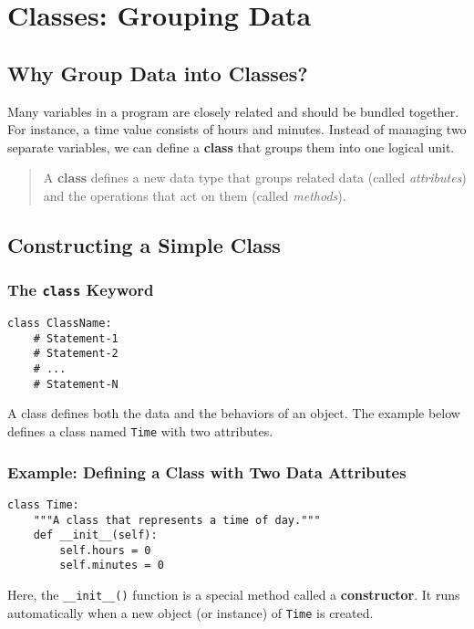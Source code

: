 \chapter{Classes: Grouping Data}

\section{Why Group Data into Classes?}

Many variables in a program are closely related and should be bundled together.
For instance, a time value consists of hours and minutes.
Instead of managing two separate variables, we can define a \textbf{class} that groups them into one logical unit.

\begin{quote}
A \textbf{class} defines a new data type that groups related data (called \emph{attributes}) and the operations that act on them (called \emph{methods}).
\end{quote}

\section{Constructing a Simple Class}

\subsection*{The \texttt{class} Keyword}

\begin{verbatim}
class ClassName:
    # Statement-1
    # Statement-2
    # ...
    # Statement-N
\end{verbatim}

A class defines both the data and the behaviors of an object.
The example below defines a class named \texttt{Time} with two attributes.

\subsection*{Example: Defining a Class with Two Data Attributes}

\begin{verbatim}
class Time:
    """A class that represents a time of day."""
    def __init__(self):
        self.hours = 0
        self.minutes = 0
\end{verbatim}

Here, the \texttt{\_\_init\_\_()} function is a special method called a \textbf{constructor}.
It runs automatically when a new object (or instance) of \texttt{Time} is created.

